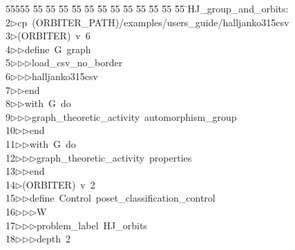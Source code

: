 %
%
\begin{tabbing}
55555 \= 55 \= 55 \= 55 \= 55 \= 55 \= 55 \= 55 \= 55 \= 55 \= 55 \= 55 \= 55 \= \>HJ\_group\_and\_orbits:\\[0pt]
2\>$\triangleright$\>cp\ (ORBITER\_PATH)/examples/users\_guide/halljanko315csv\ \\[0pt]
3\>$\triangleright$\>(ORBITER)\ v\ 6\ \\[0pt]
4\>$\triangleright$\>$\triangleright$\>define\ G\ graph\ \\[0pt]
5\>$\triangleright$\>$\triangleright$\>$\triangleright$\>load\_csv\_no\_border\ \\[0pt]
6\>$\triangleright$\>$\triangleright$\>$\triangleright$\>halljanko315csv\ \\[0pt]
7\>$\triangleright$\>$\triangleright$\>end\ \\[0pt]
8\>$\triangleright$\>$\triangleright$\>with\ G\ do\ \\[0pt]
9\>$\triangleright$\>$\triangleright$\>$\triangleright$\>graph\_theoretic\_activity\ automorphism\_group\ \\[0pt]
10\>$\triangleright$\>$\triangleright$\>end\ \\[0pt]
11\>$\triangleright$\>$\triangleright$\>with\ G\ do\ \\[0pt]
12\>$\triangleright$\>$\triangleright$\>$\triangleright$\>graph\_theoretic\_activity\ properties\ \\[0pt]
13\>$\triangleright$\>$\triangleright$\>end\\[0pt]
14\>$\triangleright$\>(ORBITER)\ v\ 2\ \\[0pt]
15\>$\triangleright$\>$\triangleright$\>define\ Control\ poset\_classification\_control\ \\[0pt]
16\>$\triangleright$\>$\triangleright$\>$\triangleright$\>W\ \\[0pt]
17\>$\triangleright$\>$\triangleright$\>$\triangleright$\>problem\_label\ HJ\_orbits\ \\[0pt]
18\>$\triangleright$\>$\triangleright$\>$\triangleright$\>depth\ 2\ \\[0pt]

\end{tabbing}
